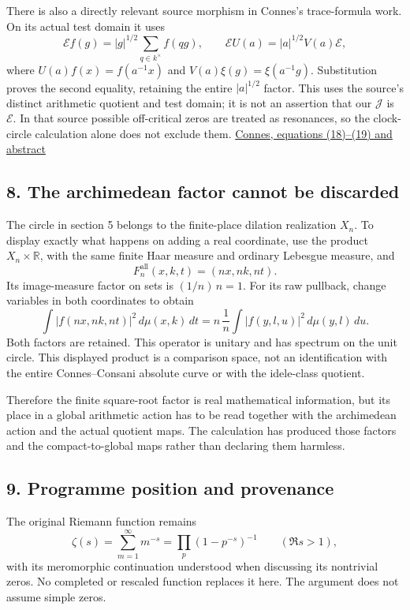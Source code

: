 \documentclass[
]{article}
\begin{document}
There is also a directly relevant source morphism in Connes's
trace-formula work. On its actual test domain it uses \[
\mathcal E f(g)=|g|^{1/2}\sum_{q\in k^\times}f(qg),
\qquad
\mathcal E U(a)=|a|^{1/2}V(a)\mathcal E,
\] where \(U(a)f(x)=f(a^{-1}x)\) and \(V(a)\xi(g)=\xi(a^{-1}g)\).
Substitution proves the second equality, retaining the entire
\(|a|^{1/2}\) factor. This uses the source's distinct arithmetic
quotient and test domain; it is not an assertion that our \(\mathcal J\)
is \(\mathcal E\). In that source possible off-critical zeros are
treated as resonances, so the clock-circle calculation alone does not
exclude them. \href{https://arxiv.org/abs/math/9811068}{Connes,
equations (18)--(19) and abstract}

\subsection{8. The archimedean factor cannot be
discarded}\label{the-archimedean-factor-cannot-be-discarded}

The circle in section 5 belongs to the finite-place dilation realization
\(X_n\). To display exactly what happens on adding a real coordinate,
use the product \(X_n\times\mathbb R\), with the same finite Haar
measure and ordinary Lebesgue measure, and \[
F_n^{\mathrm{all}}(x,k,t)=(nx,nk,nt).
\] Its image-measure factor on sets is \((1/n)\,n=1\). For its raw
pullback, change variables in both coordinates to obtain \[
\int |f(nx,nk,nt)|^2\,d\mu(x,k)\,dt
=n\,\frac1n\int |f(y,l,u)|^2\,d\mu(y,l)\,du.
\] Both factors are retained. This operator is unitary and has spectrum
on the unit circle. This displayed product is a comparison space, not an
identification with the entire Connes--Consani absolute curve or with
the idele-class quotient.

Therefore the finite square-root factor is real mathematical
information, but its place in a global arithmetic action has to be read
together with the archimedean action and the actual quotient maps. The
calculation has produced those factors and the compact-to-global maps
rather than declaring them harmless.

\subsection{9. Programme position and
provenance}\label{programme-position-and-provenance}

The original Riemann function remains \[
\zeta(s)=\sum_{m=1}^{\infty}m^{-s}
=\prod_{p}(1-p^{-s})^{-1}\qquad(\Re s>1),
\] with its meromorphic continuation understood when discussing its
nontrivial zeros. No completed or rescaled function replaces it here.
The argument does not assume simple zeros.
\end{document}
